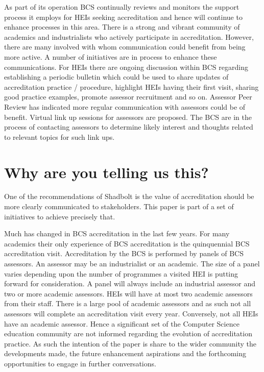 \documentclass[sigconf]{acmart}
\begin{document}
As part of its operation BCS continually reviews and monitors the support process it employs for HEIs seeking accreditation and hence will continue to enhance processes in this area.
There is a strong and vibrant community of academics and industrialists who actively participate in accreditation. However, there are many involved with whom communication could benefit from being more active. A number of initiatives are in process to enhance these communications. For HEIs there are ongoing discussion within BCS regarding establishing a periodic bulletin which could be used to share updates of accreditation practice / procedure, highlight HEIs having their first visit, sharing good practice examples, promote assessor recruitment and so on. Assessor Peer Review has indicated more regular communication with assessors could be of benefit. Virtual link up sessions for assessors are proposed. The BCS are in the process of contacting assessors to determine likely interest and thoughts related to relevant topics for such link ups.

\section{Why are you telling us this?}	
One of the recommendations of Shadbolt is the value of accreditation should be more clearly communicated to stakeholders. This paper is part of a set of initiatives to achieve precisely that.

Much has changed in BCS accreditation in the last few years. For many academics their only experience of BCS accreditation is the quinquennial BCS accreditation visit. Accreditation by the BCS is performed by panels of BCS assessors. An assessor may be an industrialist or an academic. The size of a panel varies depending upon the number of programmes a visited HEI is putting forward for consideration. A panel will always include an industrial assessor and two or more academic assessors.  HEIs will have at most two academic assessors from their staff.  There is a large pool of academic assessors and as such not all assessors will complete an accreditation visit every year. Conversely, not all HEIs have an academic assessor. Hence a significant set of the Computer Science education community are not informed regarding the evolution of accreditation practice. As such the intention of the paper is share to the wider community the developments made, the future enhancement aspirations and the forthcoming opportunities to engage in further conversations.
\end{document}
